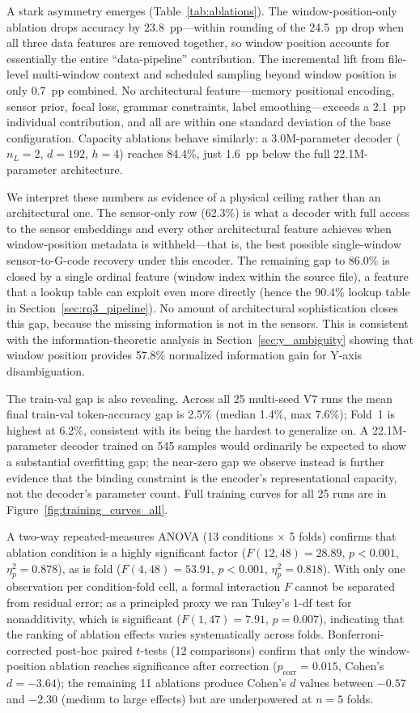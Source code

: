 \documentclass[sensors,article,submit,moreauthors,pdftex]{Definitions/mdpi}
\begin{document}
A stark asymmetry emerges (Table~\ref{tab:ablations}). The window-position-only ablation drops accuracy by 23.8~pp---within rounding of the 24.5~pp drop when all three data features are removed together, so window position accounts for essentially the entire ``data-pipeline'' contribution. The incremental lift from file-level multi-window context and scheduled sampling beyond window position is only 0.7~pp combined. No architectural feature---memory positional encoding, sensor prior, focal loss, grammar constraints, label smoothing---exceeds a 2.1~pp individual contribution, and all are within one standard deviation of the base configuration. Capacity ablations behave similarly: a 3.0M-parameter decoder ($n_L{=}2$, $d{=}192$, $h{=}4$) reaches 84.4\%, just 1.6~pp below the full 22.1M-parameter architecture.

We interpret these numbers as evidence of a physical ceiling rather than an architectural one. The sensor-only row (62.3\%) is what a decoder with full access to the sensor embeddings and every other architectural feature achieves when window-position metadata is withheld---that is, the best possible single-window sensor-to-G-code recovery under this encoder. The remaining gap to 86.0\% is closed by a single ordinal feature (window index within the source file), a feature that a lookup table can exploit even more directly (hence the 90.4\% lookup table in Section~\ref{sec:rq3_pipeline}). No amount of architectural sophistication closes this gap, because the missing information is not in the sensors. This is consistent with the information-theoretic analysis in Section~\ref{sec:y_ambiguity} showing that window position provides 57.8\% normalized information gain for Y-axis disambiguation.

The train-val gap is also revealing. Across all 25 multi-seed V7 runs the mean final train-val token-accuracy gap is 2.5\% (median 1.4\%, max 7.6\%); Fold~1 is highest at 6.2\%, consistent with its being the hardest to generalize on. A 22.1M-parameter decoder trained on 545 samples would ordinarily be expected to show a substantial overfitting gap; the near-zero gap we observe instead is further evidence that the binding constraint is the encoder's representational capacity, not the decoder's parameter count. Full training curves for all 25 runs are in Figure~\ref{fig:training_curves_all}.

A two-way repeated-measures ANOVA (13 conditions $\times$ 5 folds) confirms that ablation condition is a highly significant factor ($F(12,48) = 28.89$, $p < 0.001$, $\eta^2_p = 0.878$), as is fold ($F(4,48) = 53.91$, $p < 0.001$, $\eta^2_p = 0.818$). With only one observation per condition-fold cell, a formal interaction $F$ cannot be separated from residual error; as a principled proxy we ran Tukey's 1-df test for nonadditivity, which is significant ($F(1,47) = 7.91$, $p = 0.007$), indicating that the ranking of ablation effects varies systematically across folds. Bonferroni-corrected post-hoc paired $t$-tests (12 comparisons) confirm that only the window-position ablation reaches significance after correction ($p_\text{corr} = 0.015$, Cohen's $d = -3.64$); the remaining 11 ablations produce Cohen's $d$ values between $-0.57$ and $-2.30$ (medium to large effects) but are underpowered at $n = 5$ folds.
\end{document}
